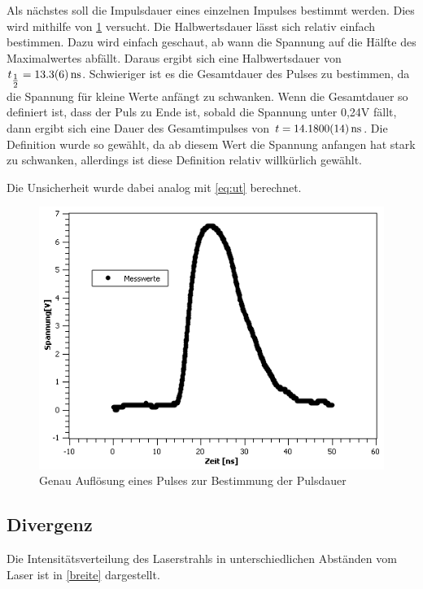 \documentclass[
	a4paper,
	12pt,
	pagesize,
	ngerman
]{scrartcl}
\begin{document}
Als nächstes soll die Impulsdauer eines einzelnen Impulses bestimmt werden. Dies wird mithilfe von \cref{Pulsdauer} versucht. Die Halbwertsdauer lässt sich relativ einfach bestimmen. Dazu wird einfach geschaut, ab wann die Spannung auf die Hälfte des Maximalwertes abfällt. Daraus ergibt sich eine Halbwertsdauer von $t_{\tfrac{1}{2}} = \SI{13,3 \pm 0,6}{ns}$. Schwieriger ist es die Gesamtdauer des Pulses zu bestimmen, da die Spannung für kleine Werte anfängt zu schwanken. Wenn die Gesamtdauer so definiert ist, dass der Puls zu Ende ist, sobald die Spannung unter 0,24V fällt, dann ergibt sich eine Dauer des Gesamtimpulses von $t = \SI{14,180 \pm 0,0014}{ns}$. Die Definition wurde so gewählt, da ab diesem Wert die Spannung anfangen hat stark zu schwanken, allerdings ist diese Definition relativ willkürlich gewählt. 

Die Unsicherheit wurde dabei analog mit \cref{eq:ut} berechnet.

\begin{figure}[h!]
	\centering
	\includegraphics[scale=0.7]{Pulsdauer.png}
	\caption{Genau Auflösung eines Pulses zur Bestimmung der Pulsdauer}
	\label{Pulsdauer}
\end{figure}

\subsection{Divergenz}
Die Intensitätsverteilung des Laserstrahls in unterschiedlichen Abständen vom Laser ist in \cref{breite} dargestellt.
\end{document}
